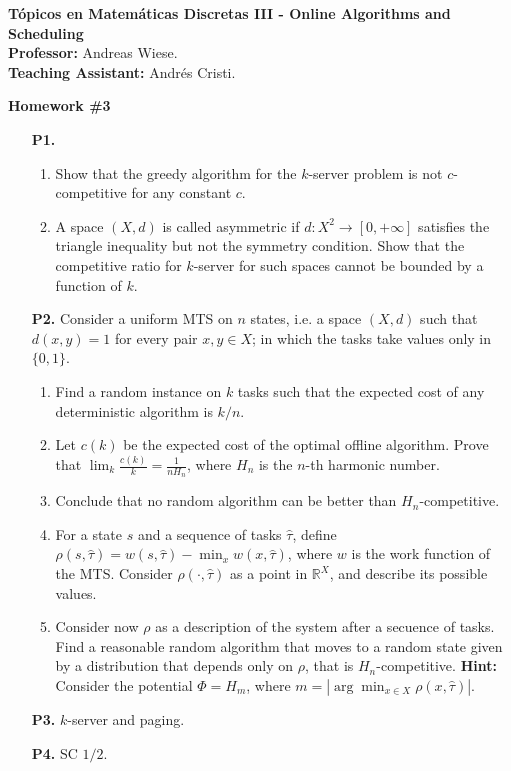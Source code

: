 \documentclass[11pt, spanish]{article}
\theoremstyle{plain}
\newcommand{\R}{\mathds{R}}
\begin{document}

\begin{flushleft}
  \textbf{Tópicos en Matemáticas Discretas III - Online Algorithms and Scheduling}
  \\\textbf{Professor:} Andreas Wiese.
  \\\textbf{Teaching Assistant:} Andrés Cristi.
\end{flushleft}


\begin{center}
  \Large{\textbf{Homework \#3}}
\end{center}




\begin{itemize}
  \item[\textbf{P1.}] 
    \begin{enumerate}
      \item Show that the greedy algorithm for the $k$-server problem
	is not $c$-competitive for any constant $c$.
      \item A space $(X,d)$ is called asymmetric if $d:X^2\rightarrow [0,+\infty]$
	satisfies the triangle inequality but not the symmetry condition. Show that
	the competitive ratio for $k$-server for such spaces cannot be bounded
	by a function of $k$.
    \end{enumerate}

  
  \item[\textbf{P2.}] Consider a uniform MTS on $n$ states, i.e. a space $(X,d)$ such
    that $d(x,y)=1$ for every pair $x,y\in X$; in which the tasks take values only in
    $\{0,1\}$.
    \begin{enumerate}
      \item Find a random instance on $k$ tasks such that the expected cost of any
	deterministic algorithm is $k/n$.
      \item Let $c(k)$ be the expected cost of the optimal offline algorithm.
	Prove that $\lim_k \frac{c(k)}{k}= \frac{1}{nH_n}$, where $H_n$ is 
	the $n$-th harmonic number.
      \item Conclude that no random algorithm can be better than $H_n$-competitive.
      \item For a state $s$ and a sequence of tasks $\hat{\tau}$, define
	$\rho(s,\hat{\tau})= w(s,\hat{\tau}) - \min_x w(x,\hat{\tau})$, where
	$w$ is the work function of the MTS. Consider $\rho(\cdot,\hat{\tau})$ as
	a point in $\R^X$, and describe its possible values.
      \item Consider now $\rho$ as a description of the system after a secuence
	of tasks. Find a reasonable random algorithm that moves to a random
	state given by a distribution that depends only on $\rho$, that is
	$H_n$-competitive. \textbf{Hint:} Consider the potential $\Phi=H_m$, where
	$m= | \arg\min_{x\in X} \rho(x,\hat{\tau}) |$.
    \end{enumerate}

  \item[\textbf{P3.}] $k$-server and paging.

  \item[\textbf{P4.}] SC $1/2$.

\end{itemize}
\end{document}
